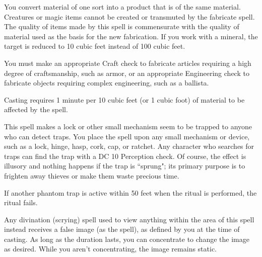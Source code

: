 \spelleffect You convert material of one sort into a product that is of the same material. Creatures or magic items cannot be created or transmuted by the fabricate spell. The quality of items made by this spell is commensurate with the quality of material used as the basis for the new fabrication. If you work with a mineral, the target is reduced to 10 cubic feet instead of 100 cubic feet.
\par You must make an appropriate Craft check to fabricate articles requiring a high degree of craftsmanship, such as armor, or an appropriate Engineering check to fabricate objects requiring complex engineering, such as a ballista.
\par Casting requires 1 minute per 10 cubic feet (or 1 cubic foot) of material to be affected by the spell.

\spelleffect This spell makes a lock or other small mechanism seem to be trapped to anyone who can detect traps. You place the spell upon any small mechanism or device, such as a lock, hinge, hasp, cork, cap, or ratchet. Any character who searches for traps can find the trap with a DC 10 Perception check. Of course, the effect is illusory and nothing happens if the trap is ``sprung"; its primary purpose is to frighten away thieves or make them waste precious time.
\par If another phantom trap is active within 50 feet when the ritual is performed, the ritual fails.

\spelldur{\durext \dismissable}
\spelleffect Any divination (scrying) spell used to view anything within the area of this spell instead receives a false image (as the  spell), as defined by you at the time of casting. As long as the duration lasts, you can concentrate to change the image as desired. While you aren't concentrating, the image remains static.

